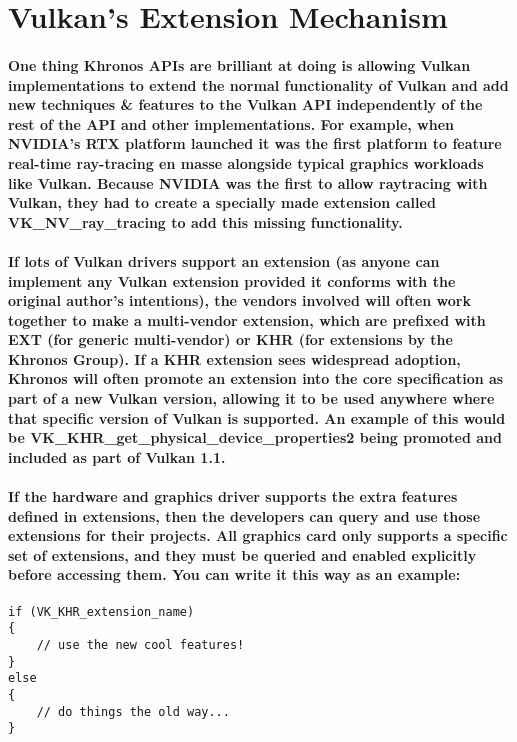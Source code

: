 \newpage
\section{Vulkan's Extension
Mechanism}\label{vulkans-extension-mechanism}

\paragraph{
One thing Khronos APIs are brilliant at doing is allowing Vulkan
implementations to extend the normal functionality of Vulkan and add new techniques \& features to the Vulkan API independently of the rest of the API and other implementations. For example, when NVIDIA's RTX platform launched it was the first platform to feature real-time ray-tracing en masse alongside typical graphics workloads like Vulkan. Because NVIDIA was the first to allow raytracing with Vulkan, they had to create a specially made extension called VK\_NV\_ray\_tracing to add this missing functionality.
}

\paragraph{
If lots of Vulkan drivers support an extension (as anyone can implement any Vulkan extension provided it conforms with the original author's intentions), the vendors involved will often work together to make a multi-vendor extension, which are prefixed with EXT (for generic multi-vendor) or KHR (for extensions by the Khronos Group). If a KHR extension sees widespread adoption, Khronos will often promote an extension into the core specification as part of a new Vulkan version, allowing it to be used anywhere where that specific version of Vulkan is
supported. An example of this would be VK\_KHR\_get\_physical\_device\_properties2 being promoted and included as part of Vulkan 1.1.
}

\paragraph{
If the hardware and graphics driver supports the extra features defined in extensions, then the developers can query and use those extensions for their projects. All graphics card only supports a specific set of extensions, and they must be queried and enabled explicitly before accessing them. You can write it this way as an example:
}

\begin{verbatim}
if (VK_KHR_extension_name)
{
    // use the new cool features!
}
else
{
    // do things the old way...
}
\end{verbatim}

